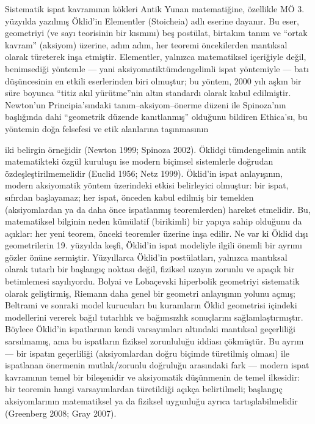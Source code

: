 Sistematik ispat kavramının kökleri Antik Yunan matematiğine, özellikle MÖ 3. yüzyılda yazılmış Öklid’in Elementler (Stoicheia) adlı eserine dayanır. Bu eser, geometriyi (ve sayı teorisinin bir kısmını) beş postülat, birtakım tanım ve “ortak kavram” (aksiyom) üzerine, adım adım, her teoremi öncekilerden mantıksal olarak türeterek inşa etmiştir. Elementler, yalnızca matematiksel içeriğiyle değil, benimsediği yöntemle — yani aksiyomatiktümdengelimli ispat yöntemiyle — batı düşüncesinin en etkili eserlerinden biri olmuştur; bu yöntem, 2000 yılı aşkın bir süre boyunca “titiz akıl yürütme”nin altın standardı olarak kabul edilmiştir. Newton’un Principia’sındaki tanım–aksiyom–önerme düzeni ile Spinoza’nın başlığında dahi “geometrik düzende kanıtlanmış” olduğunu bildiren Ethica’sı, bu yöntemin doğa felsefesi ve etik alanlarına taşınmasının

iki belirgin örneğidir (Newton 1999; Spinoza 2002). Öklidçi tümdengelimin antik matematikteki özgül kuruluşu ise modern biçimsel sistemlerle doğrudan özdeşleştirilmemelidir (Euclid 1956; Netz 1999). Öklid’in ispat anlayışının, modern aksiyomatik yöntem üzerindeki etkisi belirleyici olmuştur: bir ispat, sıfırdan başlayamaz; her ispat, önceden kabul edilmiş bir temelden (aksiyomlardan ya da daha önce ispatlanmış teoremlerden) hareket etmelidir. Bu, matematiksel bilginin neden kümülatif (birikimli) bir yapıya sahip olduğunu da açıklar: her yeni teorem, önceki teoremler üzerine inşa edilir. Ne var ki Öklid dışı geometrilerin 19. yüzyılda keşfi, Öklid’in ispat modeliyle ilgili önemli bir ayrımı gözler önüne sermiştir. Yüzyıllarca Öklid’in postülatları, yalnızca mantıksal olarak tutarlı bir başlangıç noktası değil, fiziksel uzayın zorunlu ve apaçık bir betimlemesi sayılıyordu. Bolyai ve Lobaçevski hiperbolik geometriyi sistematik olarak geliştirmiş, Riemann daha genel bir geometri anlayışının yolunu açmış; Beltrami ve sonraki model kurucuları bu kuramların Öklid geometrisi içindeki modellerini vererek bağıl tutarlılık ve bağımsızlık sonuçlarını sağlamlaştırmıştır. Böylece Öklid’in ispatlarının kendi varsayımları altındaki mantıksal geçerliliği sarsılmamış, ama bu ispatların fiziksel zorunluluğu iddiası çökmüştür. Bu ayrım — bir ispatın geçerliliği (aksiyomlardan doğru biçimde türetilmiş olması) ile ispatlanan önermenin mutlak/zorunlu doğruluğu arasındaki fark — modern ispat kavramının temel bir bileşenidir ve aksiyomatik düşünmenin de temel ilkesidir: bir teoremin hangi varsayımlardan türetildiği açıkça belirtilmeli; başlangıç aksiyomlarının matematiksel ya da fiziksel uygunluğu ayrıca tartışılabilmelidir (Greenberg 2008; Gray 2007).

